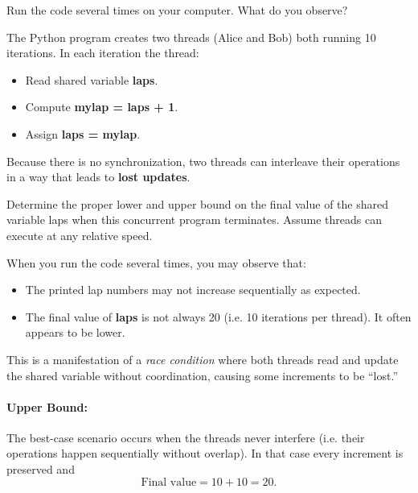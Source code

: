 \documentclass{article}
\begin{document}
\begin{enumerate}[label=\textbf{\makebox[1cm][l]{\Huge\text{(\stylishfont\alph*)}}}, leftmargin=!, labelindent=0pt]
  \item Run the code several times on your computer.
What do you observe?\newline

The Python program creates two threads (Alice and Bob) both running
10 iterations. In each iteration the thread:
\begin{itemize}
    \item Read shared variable \textbf{laps}.
    \item Compute \textbf{mylap = laps + 1}.
    \item Assign \textbf{laps = mylap}.
\end{itemize}

Because there is no synchronization, two threads can interleave
their operations in a way that leads to \textbf{lost updates}.

  
  \item Determine the proper lower and upper bound on the final value
  of the shared variable laps when this concurrent program terminates.
  Assume threads can execute at any relative speed.\newline

When you run the code several times, you may observe that:
\begin{itemize}
    \item The printed lap numbers may not increase sequentially as expected.
    \item The final value of \textbf{laps} is not always 20 (i.e. 10
    iterations per thread). It often appears to be lower.
\end{itemize}
This is a manifestation of a \emph{race condition} where both
threads read and update the shared variable without coordination,
causing some increments to be “lost.”


\paragraph{Upper Bound:} 
The best-case scenario occurs when the threads never interfere
(i.e. their operations happen sequentially without overlap).
In that case every increment is preserved and
\[
\text{Final value} = 10 + 10 = 20.
\]


\end{enumerate}
\end{document}

